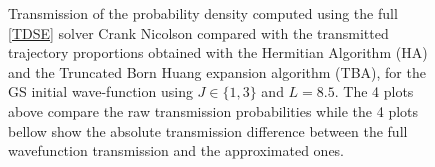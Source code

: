 \documentclass[11pt, a4paper]{article} %
\begin{document}
\begin{figure}[p]
  \centering
  \begin{subfigure}[b]{1.1\linewidth}
  \end{subfigure}
  \begin{subfigure}[b]{1.1\linewidth}
  \end{subfigure}

  
  \caption{ Transmission of the probability density computed using the full \ref{TDSE} solver Crank Nicolson compared with the transmitted trajectory proportions obtained with the Hermitian Algorithm (HA) and the Truncated Born Huang expansion algorithm (TBA), for the GS initial wave-function using $J\in\{1,3\}$ and $L=8.5$. The 4 plots above compare the raw transmission probabilities while the 4 plots bellow show the absolute transmission difference between the full wavefunction transmission and the approximated ones. }
  \label{fig:transm_GS_L85}
\end{figure}
\end{document}
